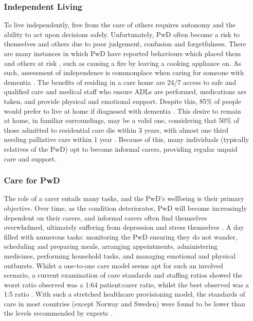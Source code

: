 \subsubsection{Independent Living}
To live independently, free from the care of others requires autonomy and the ability to act upon decisions safely. Unfortunately, PwD often become a risk to themselves and others due to poor judgement, confusion and forgetfulness. There are many instances in which PwD have reported behaviours which placed them and others at risk \cite{Sandberg2015}, such as causing a fire by leaving a cooking appliance on. As such, assessment of independence is commonplace when caring for someone with dementia \cite{Sandberg2015, GILMOUR2003}. The benefits of residing in a care home are 24/7 access to safe and qualified care and medical staff who ensure ADLs are performed, medications are taken, and provide physical and emotional support. Despite this, 85\% of people would prefer to live at home if diagnosed with dementia \cite{AlzheimersSociety2014}. This desire to remain at home, in familiar surroundings, may be a valid one, considering that 50\% of those admitted to residential care die within 3 years, with almost one third needing palliative care within 1 year \cite{Hjaltadottir2011}. Because of this, many individuals (typically relatives of the PwD) opt to become informal carers, providing regular unpaid care and support.

\subsubsection{Care for PwD}
The role of a carer entails many tasks, and the PwD's wellbeing is their primary objective. Over time, as the condition deteriorates, PwD will become increasingly dependent on their carers, and informal carers often find themselves overwhelmed, ultimately suffering from depression and stress themselves \cite{Mahoney2005}. A day filled with numerous tasks: monitoring the PwD ensuring they do not wander, scheduling and preparing meals, arranging appointments, administering medicines, performing household tasks, and managing emotional and physical outbursts. Whilst a one-to-one care model seems apt for such an involved scenario, a current examination of care standards and staffing ratios showed the worst ratio observed was a 1:64 patient:carer ratio, whilst the best observed was a 1:5 ratio \cite{Harrington2012}. With such a stretched healthcare provisioning model, the standards of care in most countries (except Norway and Sweden) were found to be lower than the levels recommended by experts \cite{Harrington2012}.

